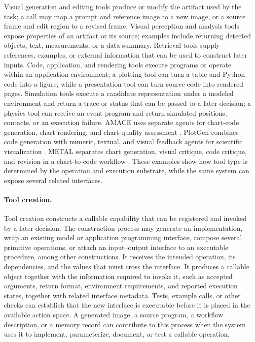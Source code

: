 Visual generation and editing tools produce or modify the artifact used by the task; a call may map a prompt and reference image to a new image, or a source frame and edit region to a revised frame. Visual perception and analysis tools expose properties of an artifact or its source; examples include returning detected objects, text, measurements, or a data summary. Retrieval tools supply references, examples, or external information that can be used to construct later inputs. Code, application, and rendering tools execute programs or operate within an application environment; a plotting tool can turn a table and Python code into a figure, while a presentation tool can turn source code into rendered pages. Simulation tools execute a candidate representation under a modeled environment and return a trace or status that can be passed to a later decision; a physics tool can receive an event program and return simulated positions, contacts, or an execution failure. AMACE uses separate agents for chart-code generation, chart rendering, and chart-quality assessment \cite{namgoong2025amace}. PlotGen combines code generation with numeric, textual, and visual feedback agents for scientific visualization \cite{goswami2025plotgen}. METAL separates chart generation, visual critique, code critique, and revision in a chart-to-code workflow \cite{li2025metal}. These examples show how tool type is determined by the operation and execution substrate, while the same system can expose several related interfaces.

\paragraph{Tool creation.}
Tool creation constructs a callable capability that can be registered and invoked by a later decision. The construction process may generate an implementation, wrap an existing model or application programming interface, compose several primitive operations, or attach an input--output interface to an executable procedure, among other constructions. It receives the intended operation, its dependencies, and the values that must cross the interface. It produces a callable object together with the information required to invoke it, such as accepted arguments, return format, environment requirements, and reported execution states, together with related interface metadata. Tests, example calls, or other checks can establish that the new interface is executable before it is placed in the available action space. A generated image, a source program, a workflow description, or a memory record can contribute to this process when the system uses it to implement, parameterize, document, or test a callable operation.

